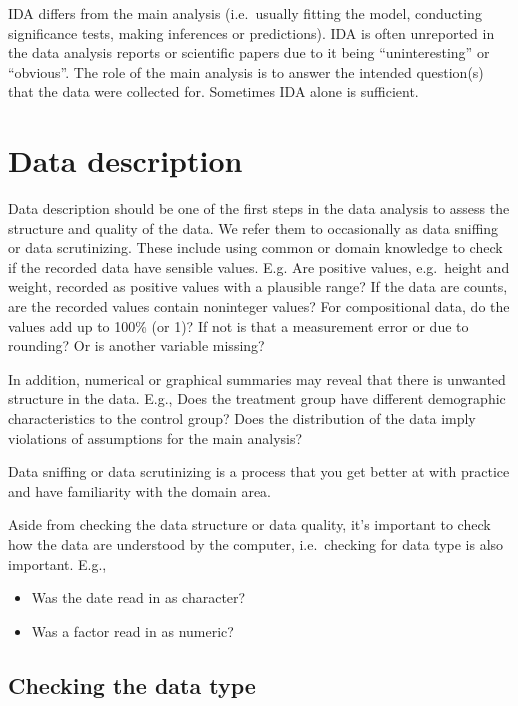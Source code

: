 \documentclass[
]{book}
\providecommand{\tightlist}{%
  \setlength{\itemsep}{0pt}\setlength{\parskip}{0pt}}
\begin{document}
IDA differs from the main analysis (i.e.~usually fitting the
model, conducting significance tests, making inferences or
predictions).
IDA is often unreported in the data analysis reports or
scientific papers due to it being ``uninteresting'' or ``obvious''.
The role of the main analysis is to answer the intended
question(s) that the data were collected for.
Sometimes IDA alone is sufficient.

\hypertarget{data-description}{%
\section{Data description}\label{data-description}}

Data description should be one of the first steps in the data
analysis to assess the structure and quality of the data. We refer them to occasionally as data sniffing or data scrutinizing. These include using common or domain knowledge to check if the recorded data have sensible values. E.g. Are positive values, e.g.~height and weight, recorded as
positive values with a plausible range? If the data are counts, are the recorded values contain noninteger values? For compositional data, do the values add up to 100\% (or 1)? If not is that a measurement error or due to rounding? Or is another variable missing?

In addition, numerical or graphical summaries may reveal that
there is unwanted structure in the data. E.g., Does the treatment group have different demographic characteristics to the control group? Does the distribution of the data imply violations of assumptions for the main analysis?

Data sniffing or data scrutinizing is a process that you get better
at with practice and have familiarity with the domain area.

Aside from checking the data structure or data quality, it's
important to check how the data are understood by the
computer, i.e.~checking for data type is also important. E.g.,

\begin{itemize}
\tightlist
\item
  Was the date read in as character?
\item
  Was a factor read in as numeric?
\end{itemize}

\hypertarget{checking-the-data-type}{%
\subsection{Checking the data type}\label{checking-the-data-type}}
\end{document}
